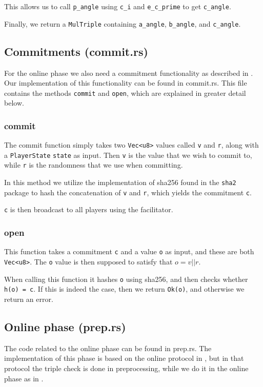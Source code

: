 \documentclass[../main.tex]{subfiles}
\begin{document}
This allows us to call \lstinline{p_angle} using \lstinline{c_i} and \lstinline{e_c_prime} to get \lstinline{c_angle}.

Finally, we return a \lstinline{MulTriple} containing \lstinline{a_angle}, \lstinline{b_angle}, and \lstinline{c_angle}.

\subsection{Commitments (commit.rs)}
For the online phase we also need a commitment functionality as described in \cite{damgaard2013practical}.
Our implementation of this functionality can be found in commit.rs. This file contains the methods \lstinline{commit} and \lstinline{open}, which are explained in greater detail below.

\subsubsection{commit}
The commit function simply takes two \lstinline{Vec<u8>} values called \lstinline{v} and \lstinline{r}, along with a \lstinline{PlayerState} \lstinline{state} as input. Then \lstinline{v} is the value that we wish to commit to, while \lstinline{r} is the randomness that we use when committing.

In this method we utilize the implementation of sha256 found in the \lstinline{sha2} package to hash the concatenation of \lstinline{v} and \lstinline{r}, which yields the commitment \lstinline{c}.

\lstinline{c} is then broadcast to all players using the facilitator.

\subsubsection{open}
This function takes a commitment \lstinline{c} and a value \lstinline{o} as input, and these are both \lstinline{Vec<u8>}. The \lstinline{o} value is then supposed to satisfy that $o = v || r$.

When calling this function it hashes \lstinline{o} using sha256, and then checks whether \lstinline{h(o) = c}. If this is indeed the case, then we return \lstinline{Ok(o)}, and otherwise we return an error.

\subsection{Online phase (prep.rs)}
The code related to the online phase can be found in prep.rs. The implementation of this phase is based on the online protocol in \cite{damgaard2013practical}, but in that protocol the triple check is done in preprocessing, while we do it in the online phase as in \cite{damgaard2012multiparty}.
\end{document}

